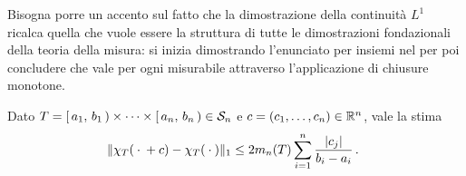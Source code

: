 Bisogna porre un accento sul fatto che la dimostrazione della continuità $L^1$ ricalca quella che vuole essere la struttura di tutte le dimostrazioni fondazionali della teoria della misura: si inizia dimostrando l'enunciato per insiemi nel \semiring{} per poi concludere che vale per ogni misurabile attraverso l'applicazione di chiusure monotone.



\begin{lemma}\label{lemma:ContinuitaL1Semianello}
	Dato $T=\left[\,a_1,\,b_1\,\right)\times\cdots\times\left[\,a_n,\,b_n\,\right)\in\mathcal S_n$ e $c=(c_1,\dots,c_n)\in\mathbb R^n$, vale la stima
	\begin{equation*}
		\Vert \chi_T({}\cdot{}+c)-\chi_T({}\cdot{})\Vert_1\le 2m_n(T)\sum_{i=1}^n \frac{\lvert c_j\rvert }{b_i-a_i} \, \text{. }
	\end{equation*}
\end{lemma}
